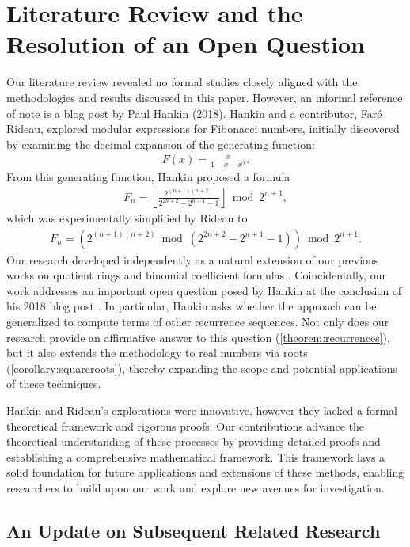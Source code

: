 \documentclass[12pt]{article}
\theoremstyle{plain}
\theoremstyle{definition}
\newcommand{\floor}[1]{\left\lfloor #1 \right\rfloor}
\begin{document}
\section{Literature Review and the Resolution of an Open Question} \label{section:litreview}
Our literature review revealed no formal studies closely aligned with the methodologies and results discussed in this paper. However, an informal reference of note is a blog post by Paul Hankin \cite{hankin2018fibonacci2} (2018). Hankin and a contributor, Faré Rideau, explored modular expressions for Fibonacci numbers, initially discovered by examining the decimal expansion of the generating function:
\begin{align*}
F(x) = \frac{x}{1-x-x^2} .
\end{align*}
From this generating function, Hankin proposed a formula
\begin{align*}
F_n = \floor{\frac{2^{(n+1)(n+2)}}{2^{2n+2} - 2^{n+1} - 1}} \bmod{2^{n+1}} ,
\end{align*}
which was experimentally simplified by Rideau to
\begin{align*}
F_n = \left( 2^{(n+1)(n+2)} \bmod{(2^{2n+2} - 2^{n+1} - 1)} \right) \bmod{2^{n+1}} .
\end{align*}
Our research developed independently as a natural extension of our previous works on quotient rings \cite{shunia2023polynomial} and binomial coefficient formulas \cite{shunia2023simple}. Coincidentally, our work addresses an important open question posed by Hankin at the conclusion of his 2018 blog post \cite{hankin2018fibonacci2}. In particular, Hankin asks whether the approach can be generalized to compute terms of other recurrence sequences. Not only does our research provide an affirmative answer to this question (\cref{theorem:recurrences}), but it also extends the methodology to real numbers via roots (\cref{corollary:squareroots}), thereby expanding the scope and potential applications of these techniques.

Hankin and Rideau's explorations were innovative, however they lacked a formal theoretical framework and rigorous proofs. Our contributions advance the theoretical understanding of these processes by providing detailed proofs and establishing a comprehensive mathematical framework. This framework lays a solid foundation for future applications and extensions of these methods, enabling researchers to build upon our work and explore new avenues for investigation.

\subsection{An Update on Subsequent Related Research}
\end{document}
